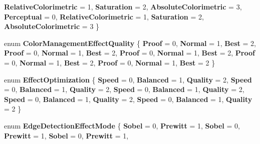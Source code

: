 \begin{DoxyCompactItemize}
{\bfseries Relative\+Colorimetric} = 1, 
{\bfseries Saturation} = 2, 
{\bfseries Absolute\+Colorimetric} = 3, 
\newline
{\bfseries Perceptual} = 0, 
{\bfseries Relative\+Colorimetric} = 1, 
{\bfseries Saturation} = 2, 
{\bfseries Absolute\+Colorimetric} = 3
 \}
\item 
\mbox{\label{namespace_microsoft_1_1_graphics_1_1_canvas_1_1_effects_a7a6e53eb824ad37f9b09d4149ae14d35}} 
enum {\bfseries Color\+Management\+Effect\+Quality} \{ \newline
{\bfseries Proof} = 0, 
{\bfseries Normal} = 1, 
{\bfseries Best} = 2, 
{\bfseries Proof} = 0, 
\newline
{\bfseries Normal} = 1, 
{\bfseries Best} = 2, 
{\bfseries Proof} = 0, 
{\bfseries Normal} = 1, 
\newline
{\bfseries Best} = 2, 
{\bfseries Proof} = 0, 
{\bfseries Normal} = 1, 
{\bfseries Best} = 2, 
\newline
{\bfseries Proof} = 0, 
{\bfseries Normal} = 1, 
{\bfseries Best} = 2
 \}
\item 
\mbox{\label{namespace_microsoft_1_1_graphics_1_1_canvas_1_1_effects_abe4426b8577454af68a566839afdea96}} 
enum {\bfseries Effect\+Optimization} \{ \newline
{\bfseries Speed} = 0, 
{\bfseries Balanced} = 1, 
{\bfseries Quality} = 2, 
{\bfseries Speed} = 0, 
\newline
{\bfseries Balanced} = 1, 
{\bfseries Quality} = 2, 
{\bfseries Speed} = 0, 
{\bfseries Balanced} = 1, 
\newline
{\bfseries Quality} = 2, 
{\bfseries Speed} = 0, 
{\bfseries Balanced} = 1, 
{\bfseries Quality} = 2, 
\newline
{\bfseries Speed} = 0, 
{\bfseries Balanced} = 1, 
{\bfseries Quality} = 2
 \}
\item 
\mbox{\label{namespace_microsoft_1_1_graphics_1_1_canvas_1_1_effects_a587bd4a5e7bae1bcbe7620bbf9ac0959}} 
enum {\bfseries Edge\+Detection\+Effect\+Mode} \{ \newline
{\bfseries Sobel} = 0, 
{\bfseries Prewitt} = 1, 
{\bfseries Sobel} = 0, 
{\bfseries Prewitt} = 1, 
\newline
{\bfseries Sobel} = 0, 
{\bfseries Prewitt} = 1, 

\end{DoxyCompactItemize}
